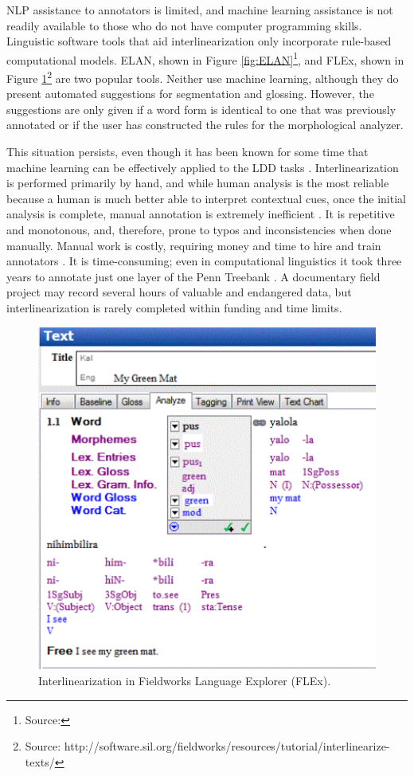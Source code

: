 \documentclass[12pt]{article}
\begin{document}
NLP assistance to annotators is limited, and machine learning assistance is not readily available to those who do not have computer programming skills. Linguistic software tools that aid interlinearization only incorporate rule-based computational models. ELAN, shown in Figure \ref{fig:ELAN}\footnote{Source: }, and FLEx, shown in Figure \ref{fig:FLEX}\footnote{Source: http://software.sil.org/fieldworks/resources/tutorial/interlinearize-texts/} are two popular tools. Neither use machine learning, although they do present automated suggestions for segmentation and glossing. However, the suggestions are only given if a word form is identical to one that was previously annotated or if the user has constructed the rules for the morphological analyzer. 

This situation persists, even though it has been known for some time that machine learning can be effectively applied to the LDD tasks \cite{baldridge_how_2009,palmer_semi-automated_2009,duong_natural_2017}. Interlinearization is performed primarily by hand, and while human analysis is the most reliable because a human is much better able to interpret contextual cues, once the initial analysis is complete, manual annotation is extremely inefficient \cite{Baldridge06,baldridge_how_2009,palmer_semi-automated_2009}. It is repetitive and monotonous, and, therefore, prone to typos and inconsistencies when done manually. Manual work is costly, requiring money and time to hire and train annotators \cite{duong_natural_2017,he_humanloop_2016}. It is time-consuming; even in computational linguistics it took three years to annotate just one layer of the Penn Treebank \cite{taylor_penn_2003}. A documentary field project may record several hours of valuable and endangered data, but interlinearization is rarely completed within funding and time limits. 

\begin{figure}[t]
\begin{center}
\includegraphics[width=0.40\columnwidth]{FLExIGT.png}
\caption{Interlinearization in Fieldworks Language Explorer (FLEx).}
\label{fig:FLEX}
\end{center}
\end{figure}
\end{document}
